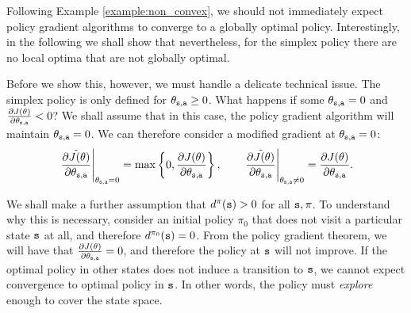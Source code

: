 
Following Example \ref{example:non_convex}, we should not immediately expect policy gradient algorithms to converge to a globally optimal policy. Interestingly, in the following we shall show that nevertheless, for the simplex policy there are no local optima that are not globally optimal.

Before we show this, however, we must handle a delicate technical issue. The simplex policy is only defined for $\theta_{{\tt s},{\tt a}}\geq 0$. What happens if some $\theta_{{\tt s},{\tt a}} = 0$ and $\frac{\partial J(\theta)}{\partial \theta_{{\tt s},{\tt a}}} < 0$? We shall assume that in this case, the policy gradient algorithm will maintain $\theta_{{\tt s},{\tt a}} = 0$. We can therefore consider a modified gradient at $\theta_{{\tt s},{\tt a}} = 0$:
\begin{equation*}
    \left.\tilde{\frac{\partial J(\theta)}{\partial \theta_{{\tt s},{\tt a}}}}\right|_{\theta_{{\tt s},{\tt a}} = 0} = \max \left\{0, \frac{\partial J(\theta)}{\partial \theta_{{\tt s},{\tt a}}}\right\}, \qquad \left.\tilde{\frac{\partial J(\theta)}{\partial \theta_{{\tt s},{\tt a}}}}\right|_{\theta_{{\tt s},{\tt a}} \neq 0} = \frac{\partial J(\theta)}{\partial \theta_{{\tt s},{\tt a}}}.
\end{equation*}

We shall make a further assumption that $d^{\pi}({\tt s}) > 0$ for all ${\tt s}, \pi$. To understand why this is necessary, consider an initial policy $\pi_0$ that does not visit a particular state ${\tt s}$ at all, and therefore $d^{\pi_0}({\tt s}) = 0$. From the policy gradient theorem, we will have that $\frac{\partial J(\theta)}{\partial \theta_{{\tt s},{\tt a}}} = 0$, and therefore the policy at ${\tt s}$ will not improve. If the optimal policy in other states does not induce a transition to ${\tt s}$, we cannot expect convergence to optimal policy in ${\tt s}$. In other words, the policy must \textit{explore} enough to cover the state space.

